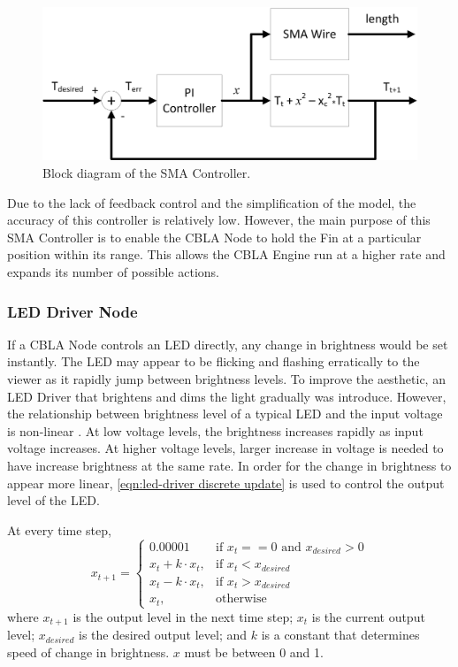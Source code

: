 \begin{figure} [!htbp]
	\centering
	\includegraphics[width=1.0\textwidth]{"fig/validations/SMA Controller"}
	\caption[Block diagram of the SMA Controller]{Block diagram of the SMA Controller. }
	\label{fig:SMA Controller}
\end{figure}

Due to the lack of feedback control and the simplification of the model, the accuracy of this controller is relatively low. However, the main purpose of this SMA Controller is to enable the CBLA Node to hold the Fin at a particular position within its range. This allows the CBLA Engine run at a higher rate and expands its number of possible actions. 


\subsubsection{LED Driver Node}

If a CBLA Node controls an LED directly, any change in brightness would be set instantly. The LED may appear to be flicking and flashing erratically to the viewer as it rapidly jump between brightness levels. To improve the aesthetic, an LED Driver that brightens and dims the light gradually was introduce. However, the relationship between brightness level of a typical LED and the input voltage is non-linear \cite{CreeLEDDatasheet}. At low voltage levels, the brightness increases rapidly as input voltage increases. At higher voltage levels, larger increase in voltage is needed to have increase brightness at the same rate. In order for the change in brightness to appear more linear, \eqref{eqn:led-driver discrete update} is used to control the output level of the LED. 

At every time step, 
\begin{equation}\label{eqn:led-driver discrete update}
	x_{t+1} =
	\begin{cases}
		0.00001 & \text{if } x_{t} == 0 \text{ and }  x_{desired} > 0 \\
		x_{t} + k \cdot x_{t}, & \text{if } x_{t} < x_{desired} \\
		x_{t} - k \cdot x_{t}, & \text{if } x_{t} > x_{desired} \\
		x_{t}, & \text{otherwise}
	\end{cases} 
\end{equation}
where $x_{t+1}$ is the output level in the next time step; $x_t$ is the current output level; $x_{desired}$ is the desired output level; and $k$ is a constant that determines speed of change in brightness. $x$ must be between 0 and 1. 

